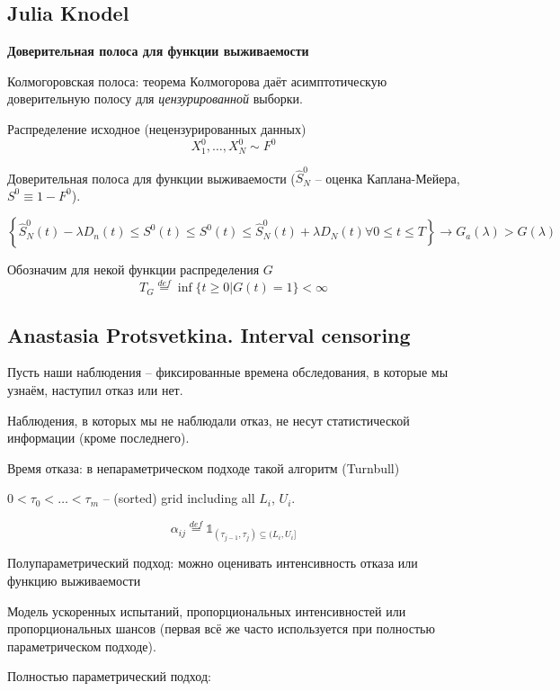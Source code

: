 \documentclass[main.tex]{subfiles}
\begin{document}
\subsection{Julia Knodel}

\textbf{Доверительная полоса для функции выживаемости}

Колмогоровская полоса: теорема Колмогорова даёт асимптотическую доверительную полосу для \emph{цензурированной} выборки.

Распределение исходное (нецензурированных данных)
\[ X_1^0, \dots, X_N^0 \sim F^0 \]

Доверительная полоса для функции выживаемости ($ \hat S^0_N $ -- оценка Каплана-Мейера, $ S^0 \equiv 1 - F^0 $).

\[ \left\{ \hat S_N^0(t) - \lambda D_n(t) \le S^0(t) \le S^0(t) \le \hat S_N^0(t) + \lambda D_N(t) \forall 0 \le t \le T \right\} \to G_a(\lambda) > G(\lambda) \]

Обозначим для некой функции распределения $ G $
\[ T_G \overset{def}= \inf \{ t \ge 0 | G(t) = 1 \} < \infty \]

\subsection{Anastasia Protsvetkina. Interval censoring}

Пусть наши наблюдения -- фиксированные времена обследования, в которые мы узнаём, наступил отказ или нет.

Наблюдения, в которых мы не наблюдали отказ, не несут статистической информации (кроме последнего).

Время отказа: в непараметрическом подходе такой алгоритм (Turnbull)

$ 0 < \tau_0 < \dots < \tau_m $ -- (sorted) grid including all $ L_i $, $ U_i $. 

\[ \alpha_{ij} \overset{def}= \mathds 1_{(\tau_{j-1}, \tau_j) \subseteq (L_i, U_i] } \]

Полупараметрический подход: можно оценивать интенсивность отказа или функцию выживаемости

Модель ускоренных испытаний, пропорциональных интенсивностей или пропорциональных шансов (первая всё же часто используется при полностью параметрическом подходе).

Полностью параметрический подход:
	
\end{document}
